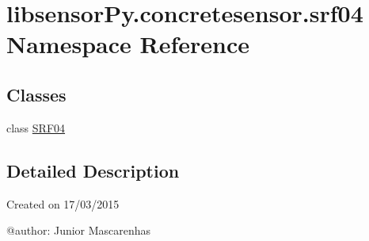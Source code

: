 \hypertarget{namespacelibsensorPy_1_1concretesensor_1_1srf04}{}\section{libsensor\+Py.\+concretesensor.\+srf04 Namespace Reference}
\label{namespacelibsensorPy_1_1concretesensor_1_1srf04}
\subsection*{Classes}
\begin{DoxyCompactItemize}
\item 
class \hyperlink{classlibsensorPy_1_1concretesensor_1_1srf04_1_1SRF04}{S\+R\+F04}
\end{DoxyCompactItemize}


\subsection{Detailed Description}
\begin{DoxyVerb}Created on 17/03/2015

@author: Junior Mascarenhas
\end{DoxyVerb}
 
